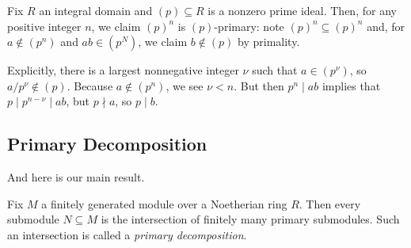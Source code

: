 \begin{example} \label{ex:primepowerprimary}
	Fix $R$ an integral domain and $(p)\subseteq R$ is a nonzero prime ideal. Then, for any positive integer $n$, we claim $(p)^n$ is $(p)$-primary: note $(p)^n\subseteq(p)^n$ and, for $a\notin(p^n)$ and $ab\in(p^N)$, we claim $b\notin(p)$ by primality.
	
	Explicitly, there is a largest nonnegative integer $\nu$ such that $a\in\left(p^\nu\right)$, so $a/p^\nu\notin(p)$. Because $a\notin\left(p^n\right)$, we see $\nu<n$. But then $p^n\mid ab$ implies that $p\mid p^{n-\nu}\mid ab$, but $p\nmid a$, so $p\mid b$.
\end{example}

\subsection{Primary Decomposition}
And here is our main result.
\begin{theorem} \label{thm:primdecompi}
	Fix $M$ a finitely generated module over a Noetherian ring $R$. Then every submodule $N\subseteq M$ is the intersection of finitely many primary submodules. Such an intersection is called a \textit{primary decomposition}.
\end{theorem}
